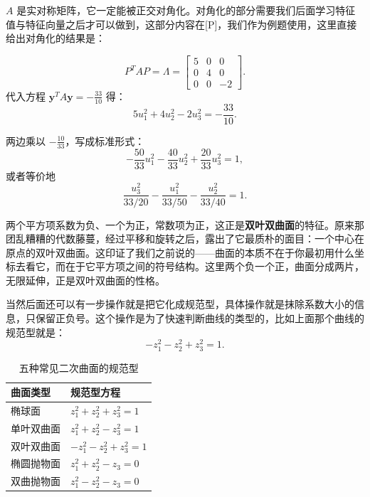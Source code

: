 \documentclass[UTF8]{ctexbook}
\begin{document}
\(A\) 是实对称矩阵，它一定能被正交对角化。对角化的部分需要我们后面学习特征值与特征向量之后才可以做到，这部分内容在[P\label{quadratic}\pageref{diag}]，我们作为例题使用，这里直接给出对角化的结果是：

\[
P^T A P = \Lambda = \begin{bmatrix} 5 & 0 & 0 \\ 0 & 4 & 0 \\ 0 & 0 & -2 \end{bmatrix}.
\]
代入方程 \(\mathbf{y}^T A \mathbf{y} = -\frac{33}{10}\) 得：
\[
5u_1^2 + 4u_2^2 - 2u_3^2 = -\frac{33}{10}.
\]

两边乘以 \(-\frac{10}{33}\)，写成标准形式：
\[
-\frac{50}{33}u_1^2 - \frac{40}{33}u_2^2 + \frac{20}{33}u_3^2 = 1,
\]
或者等价地
\[
\frac{u_3^2}{33/20} - \frac{u_1^2}{33/50} - \frac{u_2^2}{33/40} = 1.
\]

两个平方项系数为负、一个为正，常数项为正，这正是\textbf{双叶双曲面}的特征。原来那团乱糟糟的代数藤蔓，经过平移和旋转之后，露出了它最质朴的面目：一个中心在原点的双叶双曲面。这印证了我们之前说的——曲面的本质不在于你最初用什么坐标去看它，而在于它平方项之间的符号结构。这里两个负一个正，曲面分成两片，无限延伸，正是双叶双曲面的性格。

当然后面还可以有一步操作就是把它化成规范型，具体操作就是抹除系数大小的信息，只保留正负号。这个操作是为了快速判断曲线的类型的，比如上面那个曲线的规范型就是：
\[
-z_1^2- z_2^2 + z_3^2 = 1.
\]

\begin{table}[htbp]
  \centering
  \renewcommand{\arraystretch}{1.4}
  \begin{tabular}{C{0.30\textwidth} C{0.60\textwidth}}
    \toprule
    曲面类型 & 规范型方程 \\
    \midrule
    椭球面 &
    $z_1^2 + z_2^2 + z_3^2 = 1$ \\
    单叶双曲面 &
    $z_1^2 + z_2^2 - z_3^2 = 1$ \\
    双叶双曲面 &
     $-z_1^2 - z_2^2 + z_3^2 = 1$ \\
    椭圆抛物面 &
    $ z_1^2 + z_2^2-z_3 =0$ \\
    双曲抛物面 &
    $ z_1^2 - z_2^2-z_3 =0$ \\
    \bottomrule
  \end{tabular}
  \caption{五种常见二次曲面的规范型}
\end{table}
\end{document}
